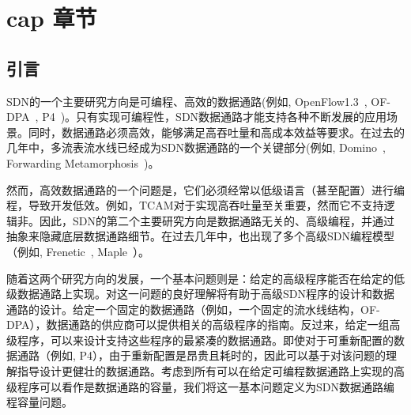 \chapter{cap 章节}


%


\section{引言}\label{sec:introduction}
SDN的一个主要研究方向是可编程、高效的数据通路(例如, OpenFlow1.3~\cite{openflow1-3}, OF-DPA~\cite{OF-DPA}, P4~\cite{P4})。只有实现可编程性，SDN数据通路才能支持各种不断发展的应用场景。同时，数据通路必须高效，能够满足高吞吐量和高成本效益等要求。在过去的几年中，多流表流水线已经成为SDN数据通路的一个关键部分(例如, Domino~\cite{sivaraman2016packet}, Forwarding Metamorphosis~\cite{rmt})。



然而，高效数据通路的一个问题是，它们必须经常以低级语言（甚至配置）进行编程，导致开发低效。例如，TCAM对于实现高吞吐量至关重要，然而它不支持逻辑非。因此，SDN的第二个主要研究方向是数据通路无关的、高级编程，并通过抽象来隐藏底层数据通路细节。在过去几年中，也出现了多个高级SDN编程模型（例如, Frenetic~\cite{foster2011frenetic}, Maple~\cite{maple}）。

随着这两个研究方向的发展，一个基本问题则是：给定的高级程序能否在给定的低级数据通路上实现。对这一问题的良好理解将有助于高级SDN程序的设计和数据通路的设计。给定一个固定的数据通路（例如，一个固定的流水线结构，OF-DPA），数据通路的供应商可以提供相关的高级程序的指南。反过来，给定一组高级程序，可以来设计支持这些程序的最紧凑的数据通路。即使对于可重新配置的数据通路（例如, P4），由于重新配置是昂贵且耗时的，因此可以基于对该问题的理解指导设计更健壮的数据通路。考虑到所有可以在给定可编程数据通路上实现的高级程序可以看作是数据通路的容量，我们将这一基本问题定义为SDN数据通路编程容量问题。

